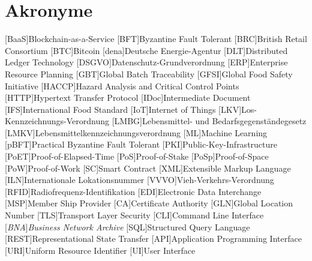 \section*{Akronyme}            %
\begin{acronym}[HACCP]
	[BaaS]{Blockchain-as-a-Service}
  [BFT]{Byzantine Fault Tolerant}
  [BRC]{British Retail Consortium}
	[BTC]{Bitcoin}
	[dena]{Deutsche Energie-Agentur}
	[DLT]{Distributed Ledger Technology}
  [DSGVO]{Datenschutz-Grundverordnung}
  [ERP]{Enterprise Resource Planning}
  [GBT]{Global Batch Traceability}
  [GFSI]{Global Food Safety Initiative}
  [HACCP]{Hazard Analysis and Critical Control Points}
  [HTTP]{Hypertext Transfer Protocol}
  [IDoc]{Intermediate Document}
  [IFS]{International Food Standard}
	[IoT]{Internet of Things}
  [LKV]{Los-Kennzeichnungs-Verordnung}
  [LMBG]{Lebensmittel- und Bedarfsgegenständegesetz}
  [LMKV]{Lebensmittelkennzeichnungsverordnung}
	[ML]{Machine Learning}
  [pBFT]{Practical Byzantine Fault Tolerant}
  [PKI]{Public-Key-Infrastructure}
  [PoET]{Proof-of-Elapsed-Time}
  [PoS]{Proof-of-Stake}
  [PoSp]{Proof-of-Space}
	[PoW]{Proof-of-Work}
	[SC]{Smart Contract}
  [XML]{Extensible Markup Language}
  [ILN]{Internationale Lokationsnummer}
  [VVVO]{Vieh-Verkehrs-Verordnung}
  [RFID]{Radiofrequenz-Identifikation}
  [EDI]{Electronic Data Interchange}
  [MSP]{Member Ship Provider}
  [CA]{Certificate Authority}
  [GLN]{Global Location Number}
  [TLS]{Transport Layer Security}
  [CLI]{Command Line Interface}
  [\textit{BNA}]{\textit{Business Network Archive}}
  [SQL]{Structured Query Language}
  [REST]{Representational State Transfer}
  [API]{Application Programming Interface}
  [URI]{Uniform Resource Identifier}
  [UI]{User Interface}
\end{acronym}

\newpage

\listoffigures
{}
\listoftables
{}
\lstlistoflistings
{}
\newpage
